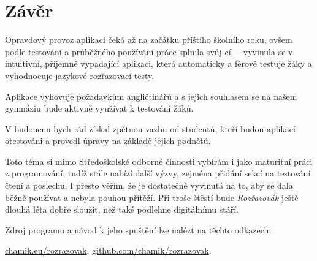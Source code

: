 \chapter*{Závěr}

Opravdový provoz aplikaci čeká až na začátku příštího školního roku, ovšem podle testování a průběžného používání práce splnila svůj cíl -- vyvinula se v intuitivní, příjemně vypadající aplikaci, která automaticky a férově testuje žáky a vyhodnocuje jazykové rozřazovací testy.

Aplikace vyhovuje požadavkům angličtinářů a s jejich souhlasem se na našem gymnáziu bude aktivně využívat k testování žáků.

V budoucnu bych rád získal zpětnou vazbu od studentů, kteří budou aplikací otestováni a provedl úpravy na základě jejich podnětů.

Toto téma si mimo Středoškolské odborné činnosti vybírám i jako maturitní práci z programování, tudíž stále nabízí další výzvy, zejména přidání sekcí na testování čtení a poslechu. I přesto věřím, že je dostatečně vyvinutá na to, aby se dala běžně používat a nebyla pouhou přítěží. Při troše štěstí bude \textit{Rozřazovák} ještě dlouhá léta dobře sloužit, než také podlehne digitálnímu stáří.

Zdroj programu a návod k jeho spuštění lze nalézt na těchto odkazech:

\href{https://chamik.eu/rozrazovak}{chamik.eu/rozrazovak},\newline
\href{https://github.com/chamik/rozrazovak/}{github.com/chamik/rozrazovak}.